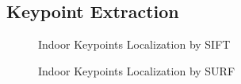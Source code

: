 \documentclass[paper=a4, fontsize=11pt]{scrartcl} %
\numberwithin{equation}{section} %
\numberwithin{figure}{section} %
\numberwithin{table}{section} %
\begin{document}
\subsection{Keypoint Extraction}
\label{sec:feature-extraction}

 

 

 

\begin{figure}[H]
\centering
{}
\hspace{1in}
\caption{Indoor Keypoints Localization by SIFT}
\label{fig:indoor1-sift} %
\end{figure}
 

\begin{figure}[H]
\centering
{}
\hspace{1in}
\caption{Indoor Keypoints Localization by SURF}
\label{fig:indoor1-surf} %
\end{figure}
 
\end{document}
